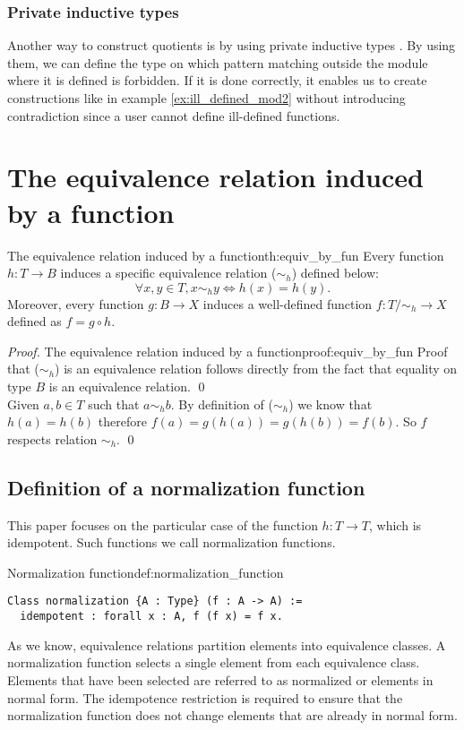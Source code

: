 \subsubsection{Private inductive types}
Another way to construct quotients is by using private inductive types \cite{PrivetInductive}. By using them, we can define the type on which pattern matching outside the module where it is defined is forbidden. If it is done correctly, it enables us to create constructions like in example \ref{ex:ill_defined_mod2} without introducing contradiction since a user cannot define ill-defined functions.

\section{The equivalence relation induced by a function}
\begin{theo}{The equivalence relation induced by a function}{th:equiv_by_fun}
Every function $h: T \rightarrow B$ induces a specific equivalence relation ($\sim_h$) defined below:
$$ \forall x, y \in T, x \sim_h y \iff h(x) = h(y). $$
Moreover, every function $g: B \rightarrow X$ induces a well-defined function $f : T/\sim_h \rightarrow X$ defined as $f = g \circ h$. 
\end{theo}

\begin{proof}{The equivalence relation induced by a function}{proof:equiv_by_fun}
Proof that ($\sim_h$) is an equivalence relation follows directly from the fact that equality on type $B$ is an equivalence relation. \qed \\ 
Given $a, b \in T$ such that $a \sim_h b$. By definition of ($\sim_h$) we know that $h(a) = h(b)$ therefore $f(a) = g(h(a)) = g(h(b)) = f(b)$. So $f$ respects relation $\sim_h$. \qed
\end{proof}
\subsection{Definition of a normalization function}
This paper focuses on the particular case of the function $h: T \rightarrow T$, which is idempotent. Such functions we call normalization functions.
\begin{defi}{Normalization function}{def:normalization_function}
\begin{verbatim}
Class normalization {A : Type} (f : A -> A) := 
  idempotent : forall x : A, f (f x) = f x.
\end{verbatim}
\end{defi}
As we know, equivalence relations partition elements into equivalence classes. A normalization function selects a single element from each equivalence class. Elements that have been selected are referred to as normalized or elements in normal form. The idempotence restriction is required to ensure that the normalization function does not change elements that are already in normal form.

